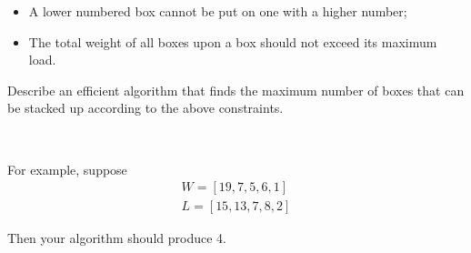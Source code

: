 \documentclass[12pt]{article}
\begin{document}
\begin{itemize}
    \item A lower numbered box cannot be put on one with a higher number;
    \item The total weight of all boxes upon a box should not exceed its maximum load.
\end{itemize}

Describe an efficient algorithm that finds the maximum number of boxes that can be stacked up according to the above constraints.

~

For example, suppose
\[ \begin{array}{l}
    W = [ 19, 7, 5, 6, 1 ] \\
    L = [ 15, 13, 7, 8, 2 ] 
\end{array}\]

Then your algorithm should produce 4. 
\end{document}
